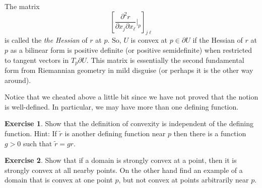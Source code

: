 \documentclass[12pt,openany]{book}
\newcommand{\myindex}[1]{#1\index{#1}}
\theoremstyle{plain}
\theoremstyle{remark}
\theoremstyle{definition}
\newenvironment{exbox}{%
    \def\FrameCommand{\vrule width 1pt \relax\hspace {10pt}}%
    \MakeFramed {\advance \hsize -\width \FrameRestore }%
}{%
    \endMakeFramed
}
\theoremstyle{exercise}
\newtheorem{exercise}{Exercise}[section]
\theoremstyle{example}
\begin{document}
The matrix
\begin{equation*}
\left[ \frac{\partial^2 r}{\partial x_j \partial x_\ell} \Big|_p
\right]_{j\ell}
\end{equation*}
is called the
\emph{\myindex{the Hessian}} of $r$ at $p$.
So, $U$ is convex at $p \in \partial U$ if
the Hessian
of $r$ at $p$ as a bilinear form is positive definite (or positive
semidefinite) when restricted to tangent vectors in $T_p \partial U$.
This matrix is essentially the second fundamental form from Riemannian
geometry in mild disguise (or perhaps it is the other way around).

Notice that we cheated above a little bit since we have not proved that
the notion is well-defined.  In particular, we may have more than
one defining function.

\begin{exbox}
\begin{exercise}
Show that the definition of convexity is independent of the defining
function.  Hint: If $\tilde{r}$ is another defining function near $p$
then there is a function $g > 0$ such that $\tilde{r} = g r$.
\end{exercise}

\begin{exercise}
Show that if a domain is strongly convex at a point, then it is
strongly convex at all nearby points.  On the other hand find an example of
a domain that is convex at one point $p$, but not convex at points
arbitrarily near $p$.
\end{exercise}
\end{exbox}
\end{document}
